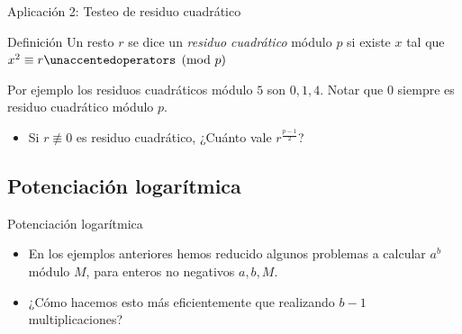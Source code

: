 \documentclass{beamer}
\begin{document}
\begin{frame}{Aplicación 2: Testeo de residuo cuadrático}
  \begin{block}{Definición}
  Un resto $r$ se dice un \textit{residuo cuadrático} módulo $p$ si existe $x$ tal que $x^2 \equiv r \modulo{p}$
  \end{block}
  Por ejemplo los residuos cuadráticos módulo $5$ son $0,1,4$. Notar que $0$ siempre es residuo cuadrático módulo $p$.
  \begin{itemize}
          \item Si $r \not \equiv 0$ es residuo cuadrático, ¿Cuánto vale $r^{\frac{p-1}{2}}$?
          \pause
  \end{itemize}
\end{frame}

\subsection{Potenciación logarítmica}

\begin{frame}{Potenciación logarítmica}
  \begin{itemize}
      \item En los ejemplos anteriores hemos reducido algunos problemas a calcular $a^b$ módulo $M$, para enteros no negativos $a,b,M$.
      \item ¿Cómo hacemos esto más eficientemente que realizando $b-1$ multiplicaciones?
  \end{itemize}
\end{frame}
\end{document}
